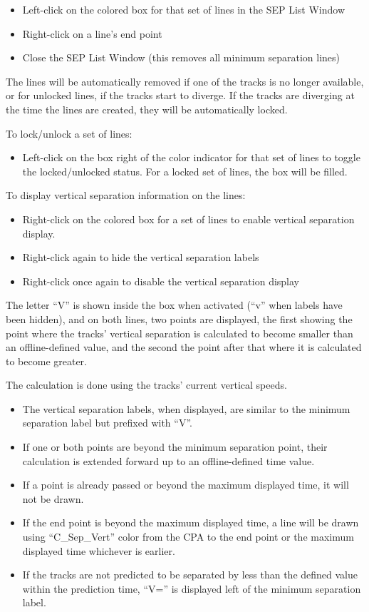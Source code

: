 \documentclass[11pt,a4paper,oldfontcommands]{memoir}
\begin{document}
\begin{itemize}
    \item Left-click on the colored box for that set of lines in the SEP List Window
    \item Right-click on a line’s end point
    \item Close the SEP List Window (this removes all minimum separation lines)
\end{itemize}

The lines will be automatically removed if one of the tracks is no longer available, or for unlocked lines, if the tracks start to diverge. If the tracks are diverging at the time the lines are created, they will be automatically locked.

To lock/unlock a set of lines:

\begin{itemize}
    \item Left-click on the box right of the color indicator for that set of lines to toggle the locked/unlocked status. For a locked set of lines, the box will be filled.
\end{itemize}

To display vertical separation information on the lines:

\begin{itemize}
    \item Right-click on the colored box for a set of lines to enable vertical separation display.
    \item Right-click again to hide the vertical separation labels
    \item Right-click once again to disable the vertical separation display
\end{itemize}

The letter “V” is shown inside the box when activated (“v” when labels have been hidden), and on both lines, two points are displayed, the first showing the point where the tracks’ vertical separation is calculated to become smaller than an offline-defined value, and the second the point after that where it is calculated to become greater. 

The calculation is done using the tracks’ current vertical speeds.

\begin{itemize}
    \item The vertical separation labels, when displayed, are similar to the minimum separation label but prefixed with “V”.
    \item If one or both points are beyond the minimum separation point, their calculation is extended forward up to an offline-defined time value.
    \item If a point is already passed or beyond the maximum displayed time, it will not be drawn.
    \item If the end point is beyond the maximum displayed time, a line will be drawn using “C\_Sep\_Vert” color from the CPA to the end point or the maximum displayed time whichever is earlier.
    \item If the tracks are not predicted to be separated by less than the defined value within the prediction time, “V=” is displayed left of the minimum separation label.
\end{itemize}
\end{document}
